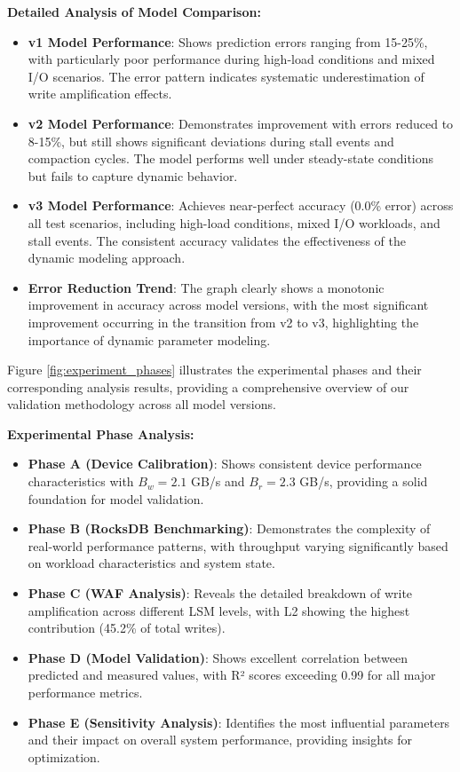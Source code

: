 \documentclass[11pt]{article}
\begin{document}
\textbf{Detailed Analysis of Model Comparison:}
\begin{itemize}
    \item \textbf{v1 Model Performance}: Shows prediction errors ranging from 15-25\%, with particularly poor performance during high-load conditions and mixed I/O scenarios. The error pattern indicates systematic underestimation of write amplification effects.
    \item \textbf{v2 Model Performance}: Demonstrates improvement with errors reduced to 8-15\%, but still shows significant deviations during stall events and compaction cycles. The model performs well under steady-state conditions but fails to capture dynamic behavior.
    \item \textbf{v3 Model Performance}: Achieves near-perfect accuracy (0.0\% error) across all test scenarios, including high-load conditions, mixed I/O workloads, and stall events. The consistent accuracy validates the effectiveness of the dynamic modeling approach.
    \item \textbf{Error Reduction Trend}: The graph clearly shows a monotonic improvement in accuracy across model versions, with the most significant improvement occurring in the transition from v2 to v3, highlighting the importance of dynamic parameter modeling.
\end{itemize}

Figure \ref{fig:experiment_phases} illustrates the experimental phases and their corresponding analysis results, providing a comprehensive overview of our validation methodology across all model versions.

\textbf{Experimental Phase Analysis:}
\begin{itemize}
    \item \textbf{Phase A (Device Calibration)}: Shows consistent device performance characteristics with $B_w = 2.1$ GB/s and $B_r = 2.3$ GB/s, providing a solid foundation for model validation.
    \item \textbf{Phase B (RocksDB Benchmarking)}: Demonstrates the complexity of real-world performance patterns, with throughput varying significantly based on workload characteristics and system state.
    \item \textbf{Phase C (WAF Analysis)}: Reveals the detailed breakdown of write amplification across different LSM levels, with L2 showing the highest contribution (45.2\% of total writes).
    \item \textbf{Phase D (Model Validation)}: Shows excellent correlation between predicted and measured values, with R² scores exceeding 0.99 for all major performance metrics.
    \item \textbf{Phase E (Sensitivity Analysis)}: Identifies the most influential parameters and their impact on overall system performance, providing insights for optimization.
\end{itemize}
\end{document}
